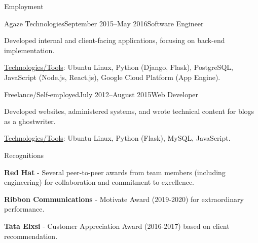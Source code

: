 \documentclass{resume} %
\begin{document}
\begin{rSection}{Employment}

\begin{rSubsection}{Agaze Technologies}{September 2015–May 2016}{Software Engineer}{}
\item Developed internal and client-facing applications, focusing on back-end implementation.
\item \underline{Technologies/Tools}: Ubuntu Linux, Python (Django, Flask), PostgreSQL, JavaScript (Node.js, React.js), Google Cloud Platform (App Engine).
\end{rSubsection}


\begin{rSubsection}{Freelance/Self-employed}{July 2012–August 2015}{Web Developer}{}
\item Developed websites, administered systems, and wrote technical content for blogs as a ghostwriter.
\item \underline{Technologies/Tools}: Ubuntu Linux, Python (Flask), MySQL, JavaScript.
\end{rSubsection}

\end{rSection}


\begin{rSection}{Recognitions}

\item {\bf Red Hat} - Several peer-to-peer awards from team members (including engineering) for collaboration and commitment to excellence.
\item {\bf Ribbon Communications} - Motivate Award (2019-2020) for extraordinary performance.
\item {\bf Tata Elxsi} - Customer Appreciation Award (2016-2017) based on client recommendation.

\end{rSection}



\end{document}
